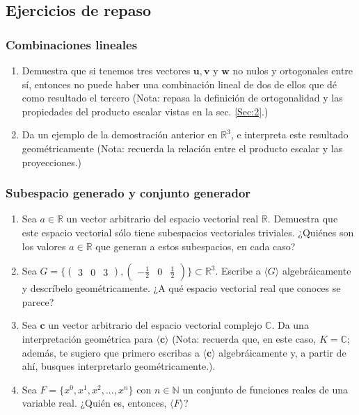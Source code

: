 \documentclass[apuntes]{subfiles}
\begin{document}
\subsection*{Ejercicios de repaso}

\subsubsection*{Combinaciones lineales}

\begin{enumerate}
    \item Demuestra que si tenemos tres vectores $\mathbf{u}, \mathbf{v}$ y $\mathbf{w}$ no nulos y ortogonales entre sí, entonces no puede haber una combinación lineal de dos de ellos que dé como resultado el tercero (Nota: repasa la definición de ortogonalidad y las propiedades del producto escalar vistas en la sec. \ref{Sec:2}.) 
    \item Da un ejemplo de la demostración anterior en $\mathbb{R}^3$, e interpreta este resultado geométricamente (Nota: recuerda la relación entre el producto escalar y las proyecciones.) 
\end{enumerate}

\subsubsection*{Subespacio generado y conjunto generador}

\begin{enumerate}
    \item Sea $a\in\mathbb{R}$ un vector arbitrario del espacio vectorial real $\mathbb{R}$. Demuestra que este espacio vectorial sólo tiene subespacios vectoriales triviales. ¿Quiénes son los valores $a\in\mathbb{R}$ que generan a estos subespacios, en cada caso? 
    \hypertarget{Ejer:3.4.2.2}{} \item Sea $G=\{\begin{pmatrix} 3 & 0 & 3 \end{pmatrix}, \begin{pmatrix} -\frac{1}{2} & 0 & \frac{1}{2} \end{pmatrix}\}\subset\mathbb{R}^3.$ Escribe a $\langle G \rangle$ algebráicamente y descríbelo geométricamente. ¿A qué espacio vectorial real que conoces se parece? 
    \item Sea $\mathbf{c}$ un vector arbitrario del espacio vectorial complejo $\mathbb{C}$. Da una interpretación geométrica para $\langle \mathbf{c} \rangle$ (Nota: recuerda que, en este caso, $K=\mathbb{C}$; además, te sugiero que primero escribas a $\langle \mathbf{c}\rangle$ algebráicamente y, a partir de ahí, busques interpretarlo geométricamente.). 
    \item Sea $F=\{x^0,x^1,x^2,...,x^n\}$ con $n\in\mathbb{N}$ un conjunto de funciones reales de una variable real. ¿Quién es, entonces, $\langle F \rangle$? 
\end{enumerate}
\end{document}
